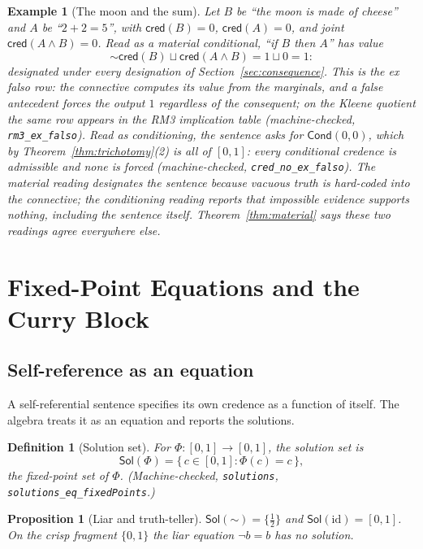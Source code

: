 \documentclass[11pt,a4paper]{article}
\newtheorem{proposition}[theorem]{Proposition}
\newtheorem{definition}[theorem]{Definition}
\newtheorem{example}[theorem]{Example}
\newcommand{\cred}{\mathsf{cred}}
\newcommand{\negc}{\mathord{\sim}}
\newcommand{\disjc}{\sqcup}
\newcommand{\Cond}{\mathsf{Cond}}
\newcommand{\Sol}{\mathsf{Sol}}
\begin{document}
\begin{example}[The moon and the sum]
\label{ex:moon}
Let $B$ be ``the moon is made of cheese'' and $A$ be ``$2+2=5$'',
with $\cred(B) = 0$, $\cred(A) = 0$, and joint
$\cred(A \land B) = 0$.
Read as a material conditional, ``if $B$ then $A$'' has value
\[
\negc \cred(B) \disjc \cred(A \land B) = 1 \disjc 0 = 1:
\]
designated under every designation of
Section~\ref{sec:consequence}.
This is the ex falso row: the connective computes its value from the
marginals, and a false antecedent forces the output $1$ regardless of
the consequent; on the Kleene quotient the same row appears in the
RM3 implication table (machine-checked, \texttt{rm3\_ex\_falso}).
Read as conditioning, the sentence asks for $\Cond(0,0)$, which by
Theorem~\ref{thm:trichotomy}(2) is all of $[0,1]$: every conditional
credence is admissible and none is forced
(machine-checked, \texttt{cred\_no\_ex\_falso}).
The material reading designates the sentence because vacuous truth is
hard-coded into the connective; the conditioning reading reports that
impossible evidence supports nothing, including the sentence itself.
Theorem~\ref{thm:material} says these two readings agree everywhere
else.
\end{example}

\section{Fixed-Point Equations and the Curry Block}
\label{sec:fixpoint}

\subsection{Self-reference as an equation}

A self-referential sentence specifies its own credence as a function
of itself.
The algebra treats it as an equation and reports the solutions.

\begin{definition}[Solution set]
\label{def:solutions}
For $\Phi : [0,1] \to [0,1]$, the \emph{solution set} is
\[
\Sol(\Phi) = \{\, c \in [0,1] : \Phi(c) = c \,\},
\]
the fixed-point set of $\Phi$.
(Machine-checked, \texttt{solutions},
\texttt{solutions\_eq\_fixedPoints}.)
\end{definition}

\begin{proposition}[Liar and truth-teller]
\label{prop:liar-tt}
$\Sol(\negc) = \{\tfrac{1}{2}\}$ and
$\Sol(\mathrm{id}) = [0,1]$.
On the crisp fragment $\{0,1\}$ the liar equation $\lnot b = b$ has
no solution.
\end{proposition}
\end{document}
